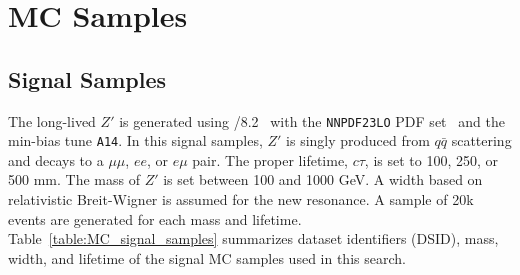 \section{MC Samples}
\label{sec:mc_sample}

\subsection{Signal Samples}
\label{sec:signal_sample}
The long-lived $Z'$ is generated using /8.2~\cite{1126-6708-2006-05-026} with the \texttt{NNPDF23LO} PDF set~\cite{Ball:2014uwa} and the min-bias tune \texttt{A14}. In this signal samples, $Z'$ is singly produced from $q\bar{q}$ scattering and decays to a $\mu\mu$, $ee$, or $e\mu$ pair. The proper lifetime, $c\tau$, is set to 100, 250, or 500 mm. The mass of $Z'$ is set between 100 and 1000 GeV. A width based on relativistic Breit-Wigner is assumed for the new resonance. A sample of 20k events are generated for each mass and lifetime. Table~\ref{table:MC_signal_samples} summarizes dataset identifiers (DSID), mass, width, and lifetime of the signal MC samples used in this search.

